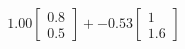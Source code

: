 \documentclass[preview]{standalone}
\begin{document}
\begin{align*}
1.00 \begin{bmatrix} 0.8 \\ 0.5 \end{bmatrix} + -0.53 \begin{bmatrix} 1 \\ 1.6 \end{bmatrix}
\end{align*}
\end{document}

